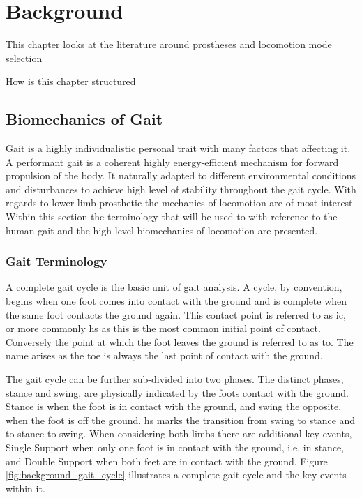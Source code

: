 \chapter{Background}
\label{chp:background}
This chapter looks at the literature around prostheses and locomotion mode selection 

How is this chapter structured

\section{Biomechanics of Gait}
Gait is a highly individualistic personal trait with many factors that affecting it\cite{Horst2019}. A performant gait is a coherent highly energy-efficient mechanism for forward propulsion of the body. It naturally adapted to different environmental conditions and disturbances to achieve high level of stability throughout the gait cycle\cite{Shah2020, Mummolo2013}. With regards to lower-limb prosthetic the mechanics of locomotion are of most interest. Within this section the terminology that will be used to with reference to the human gait and the high level biomechanics of locomotion are presented.

\subsection{Gait Terminology}
A complete gait cycle is the basic unit of gait analysis. A cycle, by convention, begins when one foot comes into contact with the ground and is complete when the same foot contacts the ground again. This contact point is referred to as \acrfull{ic}, or more commonly \acrfull{hs} as this is the most common initial point of contact. Conversely the point at which the foot leaves the ground is referred to as \acrfull{to}. The name arises as the toe is always the last point of contact with the ground.\cite{Novacheck1998, Shah2020}

The gait cycle can be further sub-divided into two phases. The distinct phases, stance and swing, are physically indicated by the foots contact with the ground. Stance is when the foot is in contact with the ground, and swing the opposite, when the foot is off the ground. \acrshort{hs} marks the transition from swing to stance and \acrshort{to} stance to swing. When considering both limbs there are additional key events, Single Support when only one foot is in contact with the ground, i.e. in stance, and Double Support when both feet are in contact with the ground. Figure \ref{fig:background_gait_cycle} illustrates a complete gait cycle and the key events within it.\cite{Novacheck1998, Shah2020}

